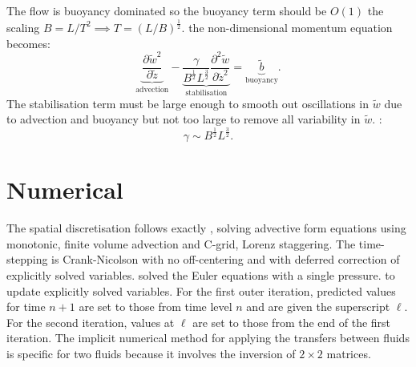 \documentclass[draft]{agujournal2019}
\begin{document}
The flow is buoyancy dominated so the buoyancy term should be $O(1)$
 the scaling $B=L/T^{2}\implies T=(L/B)^{\frac{1}{2}}$.  the non-dimensional momentum equation becomes:
\begin{equation}
\underbrace{{\frac{\partial\tilde{w}^{2}}{\partial\tilde{z}}}}_{\text{advection}}-\underbrace{{\frac{\gamma}{B^{\frac{1}{2}}L^{\frac{3}{2}}}\frac{\partial^{2}\tilde{w}}{\partial\tilde{z}^{2}}}}_{\text{stabilisation}}=\underbrace{\tilde{b}}_{\text{buoyancy}}.\label{eq:wi_nonDom-1}
\end{equation}
The stabilisation term must be large enough to smooth out oscillations
in $\tilde{w}$ due to advection and buoyancy but not too large to
remove all variability in $\tilde{w}$. :
\begin{equation}
\gamma\sim B^{\frac{1}{2}}L^{\frac{3}{2}}.\label{eq:gammaDimAnal}
\end{equation}
\section{\label{sec:numerics}Numerical }

The spatial discretisation follows exactly , solving
advective form equations using monotonic, finite volume advection
and C-grid, Lorenz staggering. The time-stepping is Crank-Nicolson
with no off-centering and with deferred correction of explicitly solved
variables.  
{solved the Euler equations with a single pressure.}
 to update explicitly solved variables. For the first outer
iteration, predicted values for time $n+1$ are set to those from
time level $n$ and are given the superscript $\ell$. For the second
iteration, values at $\ell$ are set to those from the end of the
first iteration. The implicit numerical method for applying the transfers
between fluids is specific for two fluids because it involves the
inversion of $2\times2$ matrices. 
\end{document}

